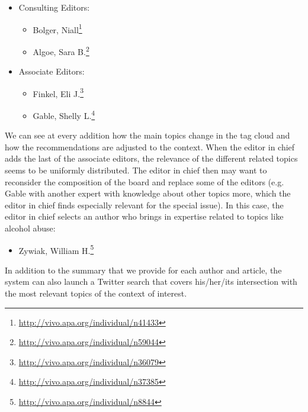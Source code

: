 \begin{itemize}
  \item Consulting Editors:
  \begin{itemize}
    \item Bolger, Niall\footnote{\url{http://vivo.apa.org/individual/n41433}}
    \item Algoe, Sara B.\footnote{\url{http://vivo.apa.org/individual/n59044}}
  \end{itemize}
  \item Associate Editors:
  \begin{itemize}
      \item Finkel, Eli J.\footnote{\url{http://vivo.apa.org/individual/n36079}}
      \item Gable, Shelly L.\footnote{\url{http://vivo.apa.org/individual/n37385}}
  \end{itemize}
\end{itemize}
We can see at every addition how the main topics change in the tag cloud and how
the recommendations are adjusted to the context. When the editor in chief adds
the last of the associate editors, the relevance of the different related topics
seems to be uniformly distributed. The editor in chief then may want to
reconsider the composition of the board and replace some of the editors (e.g.
Gable with another expert with knowledge about other topics more, which the
editor in chief finds especially relevant for the special issue).  In this case,
the editor in chief selects an author who brings in expertise related to topics
like alcohol abuse:
\begin{itemize}
  \item Zywiak, William H.\footnote{\url{http://vivo.apa.org/individual/n8844}}
\end{itemize}
In addition to the summary that we provide for each author and article, the
system can also launch a Twitter search that covers his/her/its intersection
with the most relevant topics of the context of interest.

